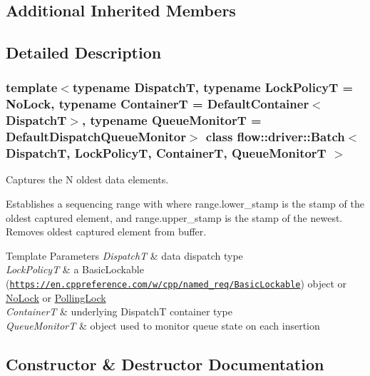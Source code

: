 \subsection*{Additional Inherited Members}


\subsection{Detailed Description}
\subsubsection*{template$<$typename DispatchT, typename Lock\+PolicyT = No\+Lock, typename ContainerT = Default\+Container$<$\+Dispatch\+T$>$, typename Queue\+MonitorT = Default\+Dispatch\+Queue\+Monitor$>$\newline
class flow\+::driver\+::\+Batch$<$ Dispatch\+T, Lock\+Policy\+T, Container\+T, Queue\+Monitor\+T $>$}

Captures the N oldest data elements. 

Establishes a sequencing range with where {\ttfamily range.\+lower\+\_\+stamp} is the stamp of the oldest captured element, and {\ttfamily range.\+upper\+\_\+stamp} is the stamp of the newest. Removes oldest captured element from buffer.


\begin{DoxyTemplParams}{Template Parameters}
{\em DispatchT} & data dispatch type \\
\hline
{\em Lock\+PolicyT} & a Basic\+Lockable (\href{https://en.cppreference.com/w/cpp/named_req/BasicLockable}{\tt https\+://en.\+cppreference.\+com/w/cpp/named\+\_\+req/\+Basic\+Lockable}) object or \hyperlink{structflow_1_1_no_lock}{No\+Lock} or \hyperlink{structflow_1_1_polling_lock}{Polling\+Lock} \\
\hline
{\em ContainerT} & underlying {\ttfamily DispatchT} container type \\
\hline
{\em Queue\+MonitorT} & object used to monitor queue state on each insertion \\
\hline
\end{DoxyTemplParams}


\subsection{Constructor \& Destructor Documentation}
\mbox{\label{classflow_1_1driver_1_1_batch_a021d7a60b375a2fea3716deb6e709487}} 
